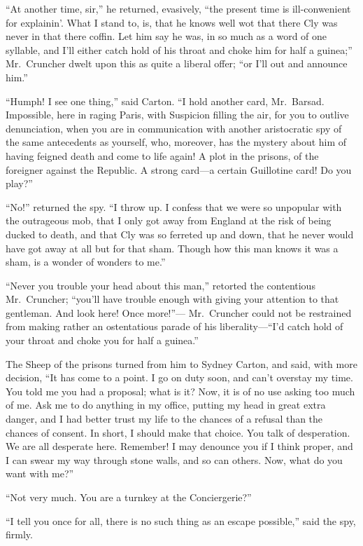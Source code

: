 ``At another time, sir,'' he returned, evasively, ``the present time is
ill-conwenient for explainin'.  What I stand to, is, that he knows
well wot that there Cly was never in that there coffin.  Let him say
he was, in so much as a word of one syllable, and I'll either catch
hold of his throat and choke him for half a guinea;'' Mr.\ Cruncher
dwelt upon this as quite a liberal offer; ``or I'll out and announce him.''

``Humph!  I see one thing,'' said Carton.  ``I hold another card,
Mr.\ Barsad.  Impossible, here in raging Paris, with Suspicion filling
the air, for you to outlive denunciation, when you are in communication
with another aristocratic spy of the same antecedents as yourself,
who, moreover, has the mystery about him of having feigned death and
come to life again!  A plot in the prisons, of the foreigner against
the Republic. A strong card---a certain Guillotine card!  Do you play?''

``No!'' returned the spy.  ``I throw up.  I confess that we were so
unpopular with the outrageous mob, that I only got away from England
at the risk of being ducked to death, and that Cly was so ferreted up
and down, that he never would have got away at all but for that sham.
Though how this man knows it was a sham, is a wonder of wonders to me.''

``Never you trouble your head about this man,'' retorted the
contentious Mr.\ Cruncher; ``you'll have trouble enough with giving
your attention to that gentleman.  And look here!  Once more!''---%
Mr.\ Cruncher could not be restrained from making rather an ostentatious
parade of his liberality---``I'd catch hold of your throat and choke
you for half a guinea.''

The Sheep of the prisons turned from him to Sydney Carton, and said,
with more decision, ``It has come to a point.  I go on duty soon, and
can't overstay my time.  You told me you had a proposal; what is it?
Now, it is of no use asking too much of me.  Ask me to do anything in
my office, putting my head in great extra danger, and I had better
trust my life to the chances of a refusal than the chances of consent.
In short, I should make that choice.  You talk of desperation.
We are all desperate here.  Remember!  I may denounce you if I think
proper, and I can swear my way through stone walls, and so can others.
Now, what do you want with me?''

``Not very much.  You are a turnkey at the Conciergerie?''

``I tell you once for all, there is no such thing as an escape possible,''
said the spy, firmly.

